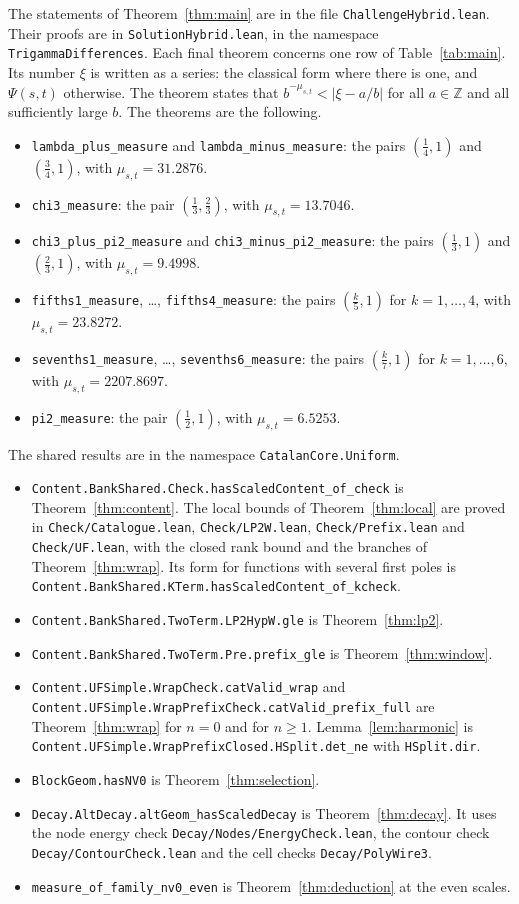 \documentclass[11pt]{amsart}
\theoremstyle{definition}
\theoremstyle{remark}
\numberwithin{equation}{section}
\newcommand{\Z}{\mathbb Z}
\newcommand{\lean}[1]{\nolinkurl{#1}}
\newcommand{\MuLamU}{31.2876}
\newcommand{\MuThirdsU}{9.4998}
\newcommand{\MuFifthsU}{23.8272}
\newcommand{\MuSeventhsU}{2207.8697}
\newcommand{\MuChi}{13.7046}
\newcommand{\MuHalvesU}{6.5253}
\begin{document}
The statements of Theorem~\ref{thm:main} are in the file \lean{ChallengeHybrid.lean}. Their proofs are in
\lean{SolutionHybrid.lean}, in the namespace \lean{TrigammaDifferences}. Each final theorem concerns one row of
Table~\ref{tab:main}. Its number $\xi$ is written as a series: the classical form where there is one, and
$\Psi(s,t)$ otherwise. The theorem states that
$b^{-\mu_{s,t}}<|\xi-a/b|$ for all $a\in\Z$ and all sufficiently large $b$. The theorems
are the following.
\begin{itemize}
\item \lean{lambda_plus_measure} and \lean{lambda_minus_measure}: the pairs $(\frac14,1)$ and $(\frac34,1)$,
 with $\mu_{s,t}=\MuLamU$.
\item \lean{chi3_measure}: the pair $(\frac13,\frac23)$, with $\mu_{s,t}=\MuChi$.
\item \lean{chi3_plus_pi2_measure} and \lean{chi3_minus_pi2_measure}: the pairs $(\frac13,1)$ and $(\frac23,1)$, with
 $\mu_{s,t}=\MuThirdsU$.
\item \lean{fifths1_measure}, \dots, \lean{fifths4_measure}: the pairs $(\frac k5,1)$ for $k=1,\dots,4$, with
 $\mu_{s,t}=\MuFifthsU$.
\item \lean{sevenths1_measure}, \dots, \lean{sevenths6_measure}: the pairs $(\frac k7,1)$ for $k=1,\dots,6$, with
 $\mu_{s,t}=\MuSeventhsU$.
\item \lean{pi2_measure}: the pair $(\frac12,1)$, with $\mu_{s,t}=\MuHalvesU$.
\end{itemize}
The shared results are in the namespace \lean{CatalanCore.Uniform}.
\begin{itemize}
\item \lean{Content.BankShared.Check.hasScaledContent_of_check} is Theorem~\ref{thm:content}. The local bounds of
 Theorem~\ref{thm:local} are proved in \lean{Check/Catalogue.lean}, \lean{Check/LP2W.lean},
 \lean{Check/Prefix.lean} and \lean{Check/UF.lean}, with the closed rank bound and the branches of
 Theorem~\ref{thm:wrap}. Its form for functions with several first poles is
 \lean{Content.BankShared.KTerm.hasScaledContent_of_kcheck}.
\item \lean{Content.BankShared.TwoTerm.LP2HypW.gle} is Theorem~\ref{thm:lp2}.
\item \lean{Content.BankShared.TwoTerm.Pre.prefix_gle} is Theorem~\ref{thm:window}.
\item \lean{Content.UFSimple.WrapCheck.catValid_wrap} and \lean{Content.UFSimple.WrapPrefixCheck.catValid_prefix_full}
 are Theorem~\ref{thm:wrap} for $n=0$ and for $n\ge1$. Lemma~\ref{lem:harmonic} is
 \lean{Content.UFSimple.WrapPrefixClosed.HSplit.det_ne} with \lean{HSplit.dir}.
\item \lean{BlockGeom.hasNV0} is Theorem~\ref{thm:selection}.
\item \lean{Decay.AltDecay.altGeom_hasScaledDecay} is Theorem~\ref{thm:decay}. It uses the node energy check
 \lean{Decay/Nodes/EnergyCheck.lean}, the contour check \lean{Decay/ContourCheck.lean} and the cell checks
 \lean{Decay/PolyWire3}.
\item \lean{measure_of_family_nv0_even} is Theorem~\ref{thm:deduction} at the even scales.
\end{itemize}
\end{document}
